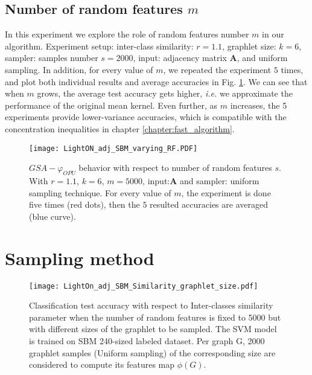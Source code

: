 \subsection{Number of random features $m$}
In this experiment we explore the role of random features number $m$ in our algorithm. 
Experiment setup: inter-class similarity: $r=1.1$, graphlet size: $k=6$, sampler: samples number $s=2000$, input: adjacency matrix $\mathbf{A}$, and uniform sampling.
In addition, for every value of $m$, we repeated the experiment $5$ times, and plot both individual results and average accuracies in Fig. \ref{fig:varying_random_features}. We can see that when $m$ grows, the average test accuracy gets higher, \emph{i.e.} we approximate the performance of the original mean kernel. Even further, as $m$ increases, the 5 experiments provide lower-variance accuracies, which is compatible with the concentration inequalities in chapter \ref{chapter:fast_algorithm}.

\begin{figure}[H]
\centering
\texttt{[image: LightON\_adj\_SBM\_varying\_RF.PDF]}
\caption[$GSA-\varphi_{OPU}$ behavior with respect to number of random features $m$]{$GSA-\varphi_{OPU}$ behavior with respect to number of random features $s$. With  $r=1.1$, $k=6$, $m=5000$, input:$\mathbf{A}$ and sampler: uniform sampling technique. For every value of $m$, the experiment is done five times (red dots), then the $5$ resulted accuracies are averaged (blue curve).}
\label{fig:varying_random_features}
\end{figure}

\section{Sampling method}

\begin{figure}[H]
\centering
\texttt{[image: LightOn\_adj\_SBM\_Similarity\_graphlet\_size.pdf]}

\caption[Classification test accuracy as a function of Inter-classes similarity parameter ]{Classification test accuracy with respect to Inter-classes similarity parameter when the number of random features is fixed to 5000 but with different sizes of the graphlet to be sampled. The SVM model is trained on SBM 240-sized labeled dataset. Per graph G, 2000 graphlet samples (Uniform sampling) of the corresponding size are considered to compute its features map $\phi(G)$.}
\label{fig:LightOn_adj_SBM_mult_factor}
\end{figure}

